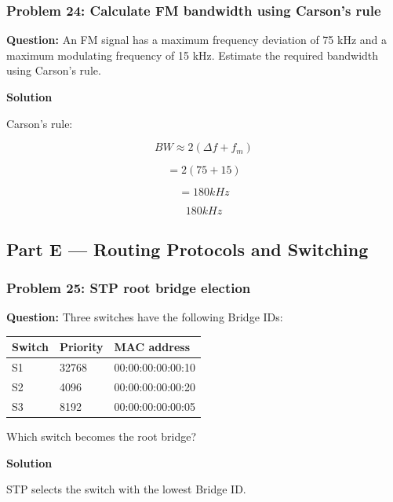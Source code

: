 \subsubsection*{Problem 24: Calculate FM bandwidth using Carson's rule}

\textbf{Question:} An FM signal has a maximum frequency deviation of 75 kHz and a maximum modulating frequency of 15 kHz. Estimate the required bandwidth using Carson's rule.

\textbf{Solution}

Carson's rule:



\[
BW\approx2(\Delta f+f_m)
\]





\[
=2(75+15)
\]





\[
=180kHz
\]





\[
\boxed{180kHz}
\]



\subsection{Part E --- Routing Protocols and Switching}
\subsubsection*{Problem 25: STP root bridge election}

\textbf{Question:} Three switches have the following Bridge IDs:

\begin{center}
\begin{tabularx}{\linewidth}{p{3.5cm} p{4.5cm} X}
\toprule
\textbf{Switch} & \textbf{Priority} & \textbf{MAC address} \\
\midrule
S1 & 32768 & 00:00:00:00:00:10 \\
S2 & 4096 & 00:00:00:00:00:20 \\
S3 & 8192 & 00:00:00:00:00:05 \\
\bottomrule
\end{tabularx}
\end{center}

Which switch becomes the root bridge?

\textbf{Solution}

STP selects the switch with the lowest Bridge ID.

